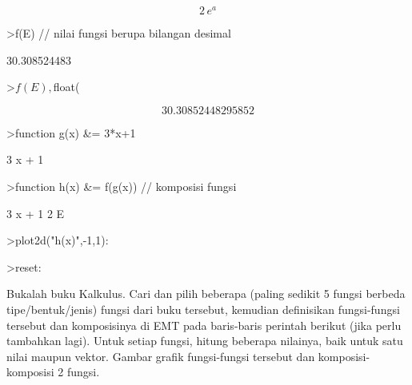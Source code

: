 \documentclass{article}
\begin{document}
\begin{eulernotebook}
\begin{euleroutput}
\end{euleroutput}
\begin{eulerformula}
\[
2\,e^{a}
\]
\end{eulerformula}
\begin{eulerprompt}
>f(E) // nilai fungsi berupa bilangan desimal
\end{eulerprompt}
\begin{euleroutput}
  30.308524483
\end{euleroutput}
\begin{eulerprompt}
>$f(E), $float(%
\end{eulerprompt}
\begin{eulerformula}
\[
30.30852448295852
\]
\end{eulerformula}
\begin{eulerprompt}
>function g(x) &= 3*x+1
\end{eulerprompt}
\begin{euleroutput}
  
                                 3 x + 1
  
\end{euleroutput}
\begin{eulerprompt}
>function h(x) &= f(g(x)) // komposisi fungsi
\end{eulerprompt}
\begin{euleroutput}
  
                                   3 x + 1
                                2 E
  
\end{euleroutput}
\begin{eulerprompt}
>plot2d("h(x)",-1,1):
\end{eulerprompt}
\begin{eulerprompt}
>reset:
\end{eulerprompt}
\begin{eulercomment}
Bukalah buku Kalkulus. Cari dan pilih beberapa (paling sedikit 5 fungsi berbeda
tipe/bentuk/jenis) fungsi dari buku tersebut, kemudian definisikan fungsi-fungsi tersebut dan
komposisinya di EMT pada baris-baris perintah berikut (jika perlu tambahkan lagi). Untuk setiap
fungsi, hitung beberapa nilainya, baik untuk satu nilai maupun vektor. Gambar grafik
fungsi-fungsi tersebut dan komposisi-komposisi 2 fungsi.


\end{eulercomment}
\end{eulernotebook}
\end{document}
